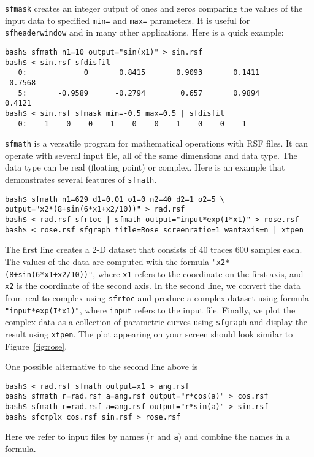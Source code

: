 \noindent\doublebox{\parbox{\textwidth}{
    
  }}

\texttt{sfmask} creates an integer output of ones and zeros comparing
the values of the input data to specified \texttt{min=} and
\texttt{max=} parameters. It is useful for \texttt{sfheaderwindow} and
in many other applications. Here is a quick example:
\begin{verbatim}
bash$ sfmath n1=10 output="sin(x1)" > sin.rsf
bash$ < sin.rsf sfdisfil
   0:             0       0.8415       0.9093       0.1411      -0.7568
   5:       -0.9589      -0.2794        0.657       0.9894       0.4121
bash$ < sin.rsf sfmask min=-0.5 max=0.5 | sfdisfil
   0:    1    0    0    1    0    0    1    0    0    1
\end{verbatim}

\noindent\doublebox{\parbox{\textwidth}{
    
  }}


\texttt{sfmath} is a versatile program for mathematical operations
with RSF files. It can operate with several input file, all of the
same dimensions and data type. The data type can be real (floating
point) or complex. Here is an example that demonstrates several
features of \texttt{sfmath}.
\begin{verbatim}
bash$ sfmath n1=629 d1=0.01 o1=0 n2=40 d2=1 o2=5 \
output="x2*(8+sin(6*x1+x2/10))" > rad.rsf
bash$ < rad.rsf sfrtoc | sfmath output="input*exp(I*x1)" > rose.rsf
bash$ < rose.rsf sfgraph title=Rose screenratio=1 wantaxis=n | xtpen
\end{verbatim}

The first line creates a 2-D dataset that consists of 40 traces 600
samples each. The values of the data are computed with the formula
\verb#"x2*(8+sin(6*x1+x2/10))"#, where \texttt{x1} refers to the
coordinate on the first axis, and \texttt{x2} is the coordinate of the
second axis. In the second line, we convert the data from real to
complex using \texttt{sfrtoc} and produce a complex dataset using
formula \verb#"input*exp(I*x1)"#, where \texttt{input} refers to the
input file. Finally, we plot the complex data as a collection of
parametric curves using \texttt{sfgraph} and display the result using
\texttt{xtpen}.  The plot appearing on your screen should look similar
to Figure~\ref{fig:rose}.


One possible alternative to the second line above is
\begin{verbatim}
bash$ < rad.rsf sfmath output=x1 > ang.rsf
bash$ sfmath r=rad.rsf a=ang.rsf output="r*cos(a)" > cos.rsf
bash$ sfmath r=rad.rsf a=ang.rsf output="r*sin(a)" > sin.rsf
bash$ sfcmplx cos.rsf sin.rsf > rose.rsf
\end{verbatim}
Here we refer to input files by names (\texttt{r} and \texttt{a}) and combine the names in a formula.

